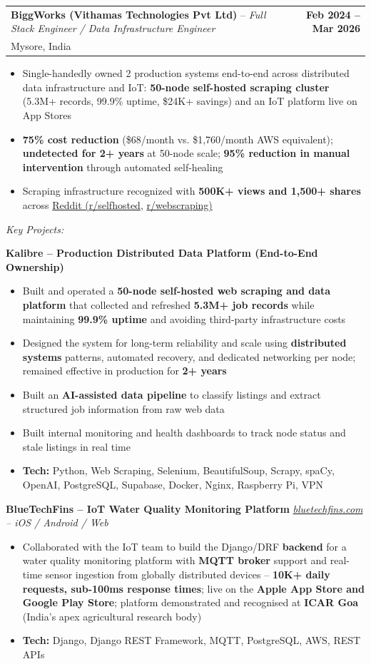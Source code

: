 \documentclass[letterpaper,10.5pt]{article}
\makeatletter
\newcommand{\resumeItem}[1]{
  \item\small{#1\vspace{1pt}}
}
\newcommand{\resumeRole}[4]{
  \vspace{-1pt}\item[]
    \begin{tabular*}{\textwidth}{l@{\extracolsep{\fill}}r}
      \textbf{#1} -- \textit{#3} & \textbf{#2}\\
      \small #4 &  \\
    \end{tabular*}\vspace{-4pt}
}
\newcommand{\bulletListStart}{\begin{itemize}[leftmargin=0.2in, itemsep=0pt, topsep=1pt]}
\newcommand{\bulletListEnd}{\end{itemize}\vspace{2pt}}
\newcommand{\projectEntry}[2]{
  \needspace{4\baselineskip}
  \vspace{4pt}
  {\small\textbf{#1}} \hfill {\small\textit{#2}}\\[-6pt]
}
\makeatother
\begin{document}
  \resumeRole
    {BiggWorks (Vithamas Technologies Pvt Ltd)}{Feb 2024 -- Mar 2026}
    {Full Stack Engineer / Data Infrastructure Engineer}{Mysore, India}
  \bulletListStart
    \resumeItem{Single-handedly owned 2 production systems end-to-end across distributed data infrastructure and IoT: \textbf{50-node self-hosted scraping cluster} (5.3M+ records, 99.9\% uptime, \$24K+ savings) and an IoT platform live on App Stores}
    \resumeItem{\textbf{75\% cost reduction} (\$68/month vs. \$1,760/month AWS equivalent); \textbf{undetected for 2+ years} at 50-node scale; \textbf{95\% reduction in manual intervention} through automated self-healing}
    \resumeItem{Scraping infrastructure recognized with \textbf{500K+ views and 1,500+ shares} across \href{https://www.reddit.com/r/selfhosted/comments/1rsflyj/fully_selfhosted_distributed_scraping/}{Reddit (r/selfhosted}, \href{https://www.reddit.com/r/webscraping/comments/1rqsvgp/python_selenium_at_scale_50_nodes_39m_records/}{r/webscraping)}}
  \bulletListEnd

  \vspace{2pt}
  {\small\textit{Key Projects:}}
  \vspace{2pt}

  \projectEntry{Kalibre -- Production Distributed Data Platform (End-to-End Ownership)}{}
  \bulletListStart
    \resumeItem{Built and operated a \textbf{50-node self-hosted web scraping and data platform} that collected and refreshed \textbf{5.3M+ job records} while maintaining \textbf{99.9\% uptime} and avoiding third-party infrastructure costs}
    \resumeItem{Designed the system for long-term reliability and scale using \textbf{distributed systems} patterns, automated recovery, and dedicated networking per node; remained effective in production for \textbf{2+ years}}
    \resumeItem{Built an \textbf{AI-assisted data pipeline} to classify listings and extract structured job information from raw web data}
    \resumeItem{Built internal monitoring and health dashboards to track node status and stale listings in real time}
    \resumeItem{\textbf{Tech:} Python, Web Scraping, Selenium, BeautifulSoup, Scrapy, spaCy, OpenAI, PostgreSQL, Supabase, Docker, Nginx, Raspberry Pi, VPN}
  \bulletListEnd

  \projectEntry{BlueTechFins -- IoT Water Quality Monitoring Platform}{\href{https://bluetechfins.com/}{bluetechfins.com} -- iOS / Android / Web}
  \bulletListStart
    \resumeItem{Collaborated with the IoT team to build the Django/DRF \textbf{backend} for a water quality monitoring platform with \textbf{MQTT broker} support and real-time sensor ingestion from globally distributed devices -- \textbf{10K+ daily requests, sub-100ms response times}; live on the \textbf{Apple App Store and Google Play Store}; platform demonstrated and recognised at \textbf{ICAR Goa} (India's apex agricultural research body)}
    \resumeItem{\textbf{Tech:} Django, Django REST Framework, MQTT, PostgreSQL, AWS, REST APIs}
  \bulletListEnd
\end{document}
